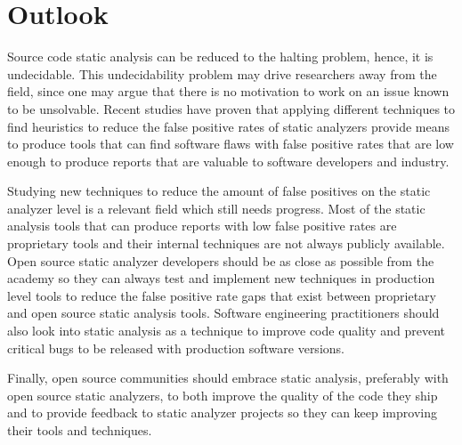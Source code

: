 \section{Outlook}

Source code static analysis can be reduced to the halting problem, hence, it is
undecidable. This undecidability problem may drive researchers away from the
field, since one may argue that there is no motivation to work on an issue
known to be unsolvable. Recent studies have proven that applying different 
techniques to find heuristics to reduce the false positive rates of static
analyzers provide means to produce tools that can find software flaws with
false positive rates that are low enough to produce reports that are valuable
to software developers and industry.

Studying new techniques to reduce the amount of false positives on the static
analyzer level is a relevant field which still needs progress. Most of the
static analysis tools that can produce reports with low false positive
rates are proprietary tools and their internal techniques are not always
publicly available. Open source static analyzer developers should be as close
as possible from the academy so they can always test and implement new
techniques in production level tools to reduce the false positive rate gaps
that exist between proprietary and open source static analysis tools. Software
engineering practitioners should also look into static analysis as a technique
to improve code quality and prevent critical bugs to be released with
production software versions.

Finally, open source communities should embrace static analysis, preferably
with open source static analyzers, to both improve the quality of the code they
ship and to provide feedback to static analyzer projects so they can keep
improving their tools and techniques.
